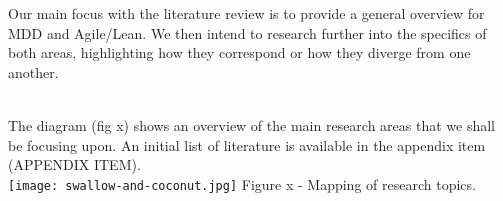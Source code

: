 

Our main focus with the literature review is to provide a general overview for MDD and Agile/Lean. We then intend to research further into the specifics of both areas, highlighting how they correspond or how they diverge from one another. 

\hspace{0pt} \\
The diagram (fig x) shows an overview of the main research areas that we shall be focusing upon. An initial list of literature is available in the appendix item (APPENDIX ITEM).
\hspace{0pt} \\

\texttt{[image: swallow-and-coconut.jpg]}
Figure x - Mapping of research topics.
